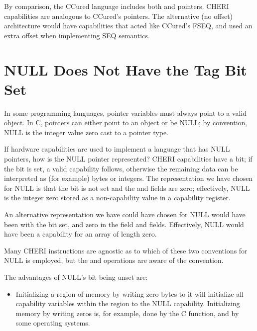 By comparison, the CCured language includes both  and
 pointers. CHERI capabilities are analogous to CCured's
 pointers. The alternative (no offset) architecture
would have capabilities that acted like CCured's FSEQ, and used an extra
offset when implementing SEQ semantics.

\section{NULL Does Not Have the Tag Bit Set}

In some programming languages, pointer variables must always point to
a valid object. In C, pointers can either point to an object or be NULL;
by convention, NULL is the integer value zero cast to a pointer type.

If hardware capabilities are used to implement a language that has NULL
pointers, how is the NULL pointer represented? CHERI capabilities have
a \ctag{} bit; if the \ctag{} bit is set, a valid capability follows, otherwise
the remaining data can be interpreted as (for example) bytes or integers.
The representation we have chosen for NULL is that the \ctag{} bit is not set
and the \cbase{} and \clength{} fields are zero; effectively, NULL is the
integer zero stored as a non-capability value in a capability register.

An alternative representation we have could have chosen for NULL would
have been with the \ctag{} bit set, and zero in the \cbase{} field and
\clength{} fields.  Effectively, NULL would have been a capability for
an array of length zero.

Many CHERI instructions are agnostic as to which of these two
conventions for NULL is employed, but the  and
 operations are aware of the
convention.

The advantages of NULL's \ctag{} bit being unset are:

\begin{itemize}
\item
Initializing a region of memory by writing zero bytes to it will initialize
all capability variables within the region to the NULL capability. Initializing
memory by writing zeros is, for example, done by the C 
function, and by some operating systems.
\end{itemize}

